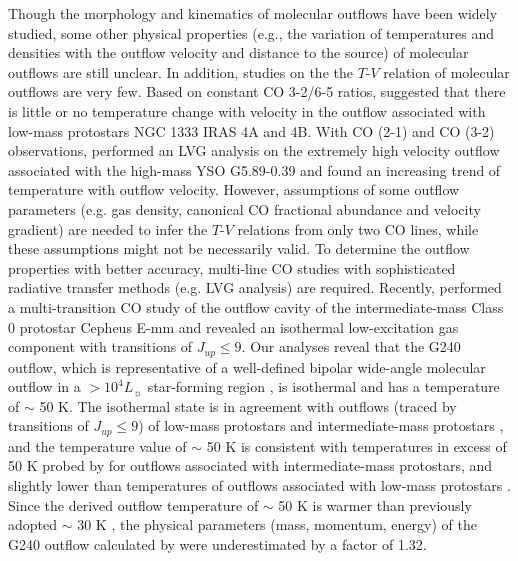 Though the morphology and kinematics of molecular outflows have been widely studied, some other physical properties (e.g., the variation of temperatures and densities with the outflow velocity and distance to the source) of molecular outflows are still unclear. In addition, studies on the the $T$-$V$ relation of molecular outflows are very few. Based on constant CO 3-2/6-5 ratios, \citet{2012A&A...542A..86Y} suggested that there is little or no temperature change with velocity in the outflow associated with low-mass protostars NGC 1333 IRAS 4A and 4B. With CO (2-1) and CO (3-2) observations, \citet{2012ApJ...744L..26S} performed an LVG analysis on the extremely high velocity outflow associated with the high-mass YSO G5.89-0.39 and found an increasing trend of temperature with outflow velocity. However, assumptions of some outflow parameters (e.g. gas density, canonical CO fractional abundance and velocity gradient) are needed to infer the $T$-$V$ relations from only two CO lines, while these assumptions might not be necessarily valid. To determine the outflow properties with better accuracy, multi-line CO studies with sophisticated radiative transfer methods (e.g. LVG analysis) are required. Recently, \citet{2015A&A...581A...4L} performed a multi-transition CO study of the outflow cavity of the intermediate-mass Class 0 protostar Cepheus E-mm and revealed an isothermal low-excitation gas component with transitions of $J_{up} \le 9$. Our analyses reveal that the G240 outflow, which is representative of a well-defined bipolar wide-angle molecular outflow in a $> 10^4 L_\sun$ star-forming region \citep{2009ApJ...696...66Q}, is isothermal and has a temperature of $\sim$ 50 K. The isothermal state is in agreement with outflows (traced by transitions of $J_{up} \le 9$) of low-mass protostars and intermediate-mass protostars \citep{2012A&A...542A..86Y, 2015A&A...581A...4L}, and the temperature value of $\sim$ 50 K is consistent with temperatures in excess of 50 K probed by \citet{2016A&A...587A..17V} for outflows associated with intermediate-mass protostars, and slightly lower than temperatures of outflows associated with low-mass protostars \citep{2009A&A...501..633V, 2012A&A...542A..86Y}. Since the derived outflow temperature of $\sim$ 50 K is warmer than previously adopted $\sim$ 30 K \citep{2009ApJ...696...66Q}, the physical parameters (mass, momentum, energy) of the G240 outflow calculated by \citet{2009ApJ...696...66Q} were underestimated by a factor of 1.32.  


